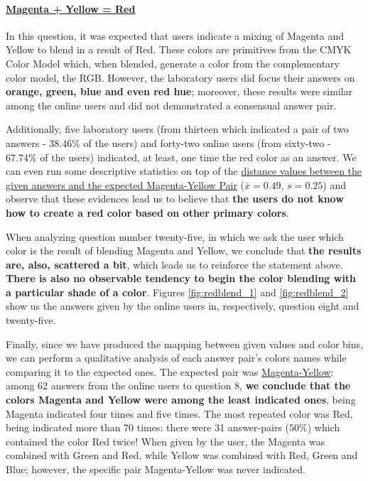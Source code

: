 \paragraph{\ul{Magenta + Yellow = Red}}
%
In this question, it was expected that users indicate a mixing of Magenta and Yellow to blend in a result of Red. These colors are primitives from the CMYK Color Model which, when blended, generate a color from the
complementary color model, the RGB. However, the laboratory users did focus their answers on \textbf{orange, green, blue and even red hue}; moreover, these results were similar among the online users and did not
demonstrated a consensual answer pair. \par
%
Additionally, five laboratory users (from thirteen which indicated a pair of two answers - $38.46\%$ of the users) and forty-two online users (from sixty-two - $67.74\%$ of the users) indicated, at least, one time the
red color as an answer. We can even run some descriptive statistics on top of the \ul{distance values between the given answers and the expected Magenta-Yellow Pair} ($\overline{x} = 0.49$, $s = 0.25$) and observe that
these evidences lead us to believe that \textbf{the users do not know how to create a red color based on other primary colors}. \par
%
When analyzing question number twenty-five, in which we ask the user which color is the result of blending Magenta and Yellow, we conclude that \textbf{the results are, also,
scattered a bit}, which leads us to reinforce the statement above. \textbf{There is also no observable tendency to begin the color blending with a particular shade of a color}. Figures \ref{fig:redblend_1} and
\ref{fig:redblend_2} show us the answers given by the online users in, respectively, question eight and twenty-five. \par
%
Finally, since we have produced the mapping between given values and color bins, we can perform a qualitative analysis of
each answer pair's colors names while comparing it to the expected ones. The expected pair was \ul{Magenta-Yellow}: among
62 answers from the online users to question 8, \textbf{we conclude that the colors Magenta and Yellow were among the least
indicated ones}, being Magenta indicated four times and five times. The most repeated color was Red, being indicated more than
70 times: there were 31 answer-pairs ($50\%$) which contained the color Red twice! When given by the user, the Magenta was combined
with Green and Red, while Yellow was combined with Red, Green and Blue; however, the specific pair Magenta-Yellow was never indicated.
